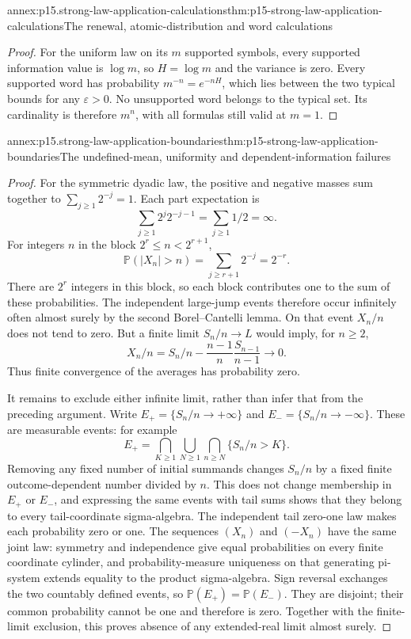\begin{annexitem}{annex:p15.strong-law-application-calculations}{thm:p15-strong-law-application-calculations}{The renewal, atomic-distribution and word calculations}
\begin{proof}
For the uniform law on its \(m\) supported symbols, every supported
information value is \(\log m\), so \(H=\log m\) and the variance
is zero. Every supported word has probability \(m^{-n}=e^{-nH}\),
which lies between the two typical bounds for any \(\varepsilon>0\).
No unsupported word belongs to the typical set. Its cardinality is
therefore \(m^n\), with all formulas still valid at \(m=1\).
\end{proof}
\end{annexitem}

\begin{annexitem}{annex:p15.strong-law-application-boundaries}{thm:p15-strong-law-application-boundaries}{The undefined-mean, uniformity and dependent-information failures}
\begin{proof}
For the symmetric dyadic law, the positive and negative masses sum
together to \(\sum_{j\geq1}2^{-j}=1\). Each part expectation is
\[
 \sum_{j\geq1}2^j2^{-j-1}=\sum_{j\geq1}1/2=\infty.
\]
For integers \(n\) in the block \(2^r\leq n<2^{r+1}\),
\[
 \mathbb P(|X_n|>n)=\sum_{j\geq r+1}2^{-j}=2^{-r}.
\]
There are \(2^r\) integers in this block, so each block contributes
one to the sum of these probabilities. The independent large-jump
events therefore occur infinitely often almost surely by the second
Borel--Cantelli lemma. On that event \(X_n/n\) does not tend to zero.
But a finite limit \(S_n/n\to L\) would imply, for \(n\geq2\),
\[
 X_n/n=S_n/n-\frac{n-1}{n}\frac{S_{n-1}}{n-1}\longrightarrow0.
\]
Thus finite convergence of the averages has probability zero.

It remains to exclude either infinite limit, rather than infer that
from the preceding argument. Write \(E_+=\{S_n/n\to+\infty\}\)
and \(E_-=\{S_n/n\to-\infty\}\). These are measurable events:
for example
\[
 E_+=\bigcap_{K\geq1}\bigcup_{N\geq1}
                      \bigcap_{n\geq N}\{S_n/n>K\}.
\]
Removing any fixed number of initial summands changes \(S_n/n\)
by a fixed finite outcome-dependent number divided by \(n\).
This does not change membership in \(E_+\) or \(E_-\), and
expressing the same events with tail sums shows that they belong
to every tail-coordinate sigma-algebra. The independent tail zero-one
law makes each probability zero or one.
The sequences \((X_n)\) and \((-X_n)\) have the same joint law:
symmetry and independence give equal probabilities on every finite
coordinate cylinder, and probability-measure uniqueness on that
generating pi-system extends equality to the product sigma-algebra.
Sign reversal exchanges the two countably defined events, so
\(\mathbb P(E_+)=\mathbb P(E_-)\). They are disjoint; their common
probability cannot be one and therefore is zero. Together with the
finite-limit exclusion, this proves absence of any extended-real
limit almost surely.


\end{proof}
\end{annexitem}
